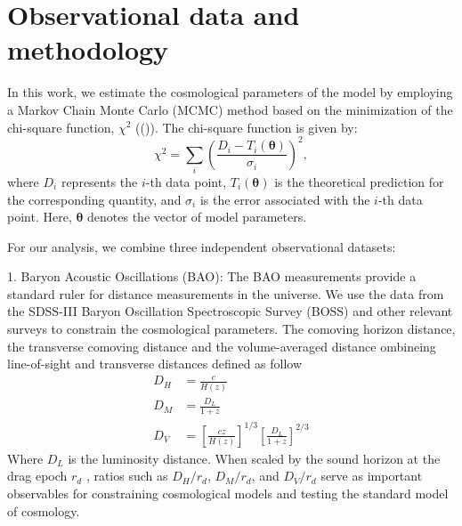\documentclass[preprint]{aastex631}
\begin{document}

\section{Observational data and methodology}

In this work, we estimate the cosmological parameters of the model by employing a Markov Chain Monte Carlo (MCMC) method based on the minimization of the chi-square function, \(\chi^2\) ((\cite{Padilla_2021})). The chi-square function is given by:
\begin{equation}
\chi^2 = \sum_i \left(\frac{D_i - T_i(\mathbf{\theta})}{\sigma_i}\right)^2,
\end{equation}
where \(D_i\) represents the \(i\)-th data point, \(T_i(\mathbf{\theta})\) is the theoretical prediction for the corresponding quantity, and \(\sigma_i\) is the error associated with the \(i\)-th data point. Here, \(\mathbf{\theta}\) denotes the vector of model parameters.

For our analysis, we combine three independent observational datasets:

1. Baryon Acoustic Oscillations (BAO): The BAO measurements provide a standard ruler for distance measurements in the universe. We use the data from the SDSS-III Baryon Oscillation Spectroscopic Survey (BOSS) and other relevant surveys to constrain the cosmological parameters. The comoving horizon distance, the transverse comoving distance
and the volume-averaged distance ombineing line-of-sight and transverse distances defined as follow
\begin{align}
    D_H&=\frac{c}{H(z)} \\
    D_M&=\frac{D_L}{1+z}\\
    D_V&=\left[\frac{cz}{H(z)}\right]^{1/3}\left[\frac{D_L}{1+z}\right]^{2/3}
\end{align}
Where $D_L$ is the luminosity distance. When scaled by the sound horizon at the drag epoch \(r_d\) , ratios such as \(D_H/r_d\), \(D_M/r_d\), and \(D_V/r_d\) serve as important observables for constraining cosmological models and testing the standard model of cosmology.
\end{document}
